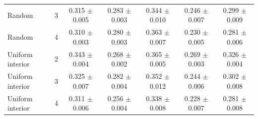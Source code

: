 \begin{table}[t]
\begin{tabular}{lcccccc}
Random & 3 & 0.315 $\pm$ 0.005 & 0.283 $\pm$ 0.003 & 0.344 $\pm$ 0.010 & 0.246 $\pm$ 0.007 & 0.299 $\pm$ 0.009 \\
Random & 4 & 0.310 $\pm$ 0.003 & 0.280 $\pm$ 0.003 & 0.363 $\pm$ 0.007 & 0.230 $\pm$ 0.005 & 0.281 $\pm$ 0.006 \\
Uniform interior & 2 & 0.343 $\pm$ 0.004 & 0.268 $\pm$ 0.002 & 0.365 $\pm$ 0.005 & 0.269 $\pm$ 0.003 & 0.326 $\pm$ 0.004 \\
Uniform interior & 3 & 0.325 $\pm$ 0.007 & 0.282 $\pm$ 0.004 & 0.352 $\pm$ 0.012 & 0.244 $\pm$ 0.006 & 0.302 $\pm$ 0.008 \\
Uniform interior & 4 & 0.311 $\pm$ 0.006 & 0.256 $\pm$ 0.004 & 0.338 $\pm$ 0.008 & 0.228 $\pm$ 0.007 & 0.281 $\pm$ 0.008 \\
\bottomrule
\end{tabular}
\end{table}
